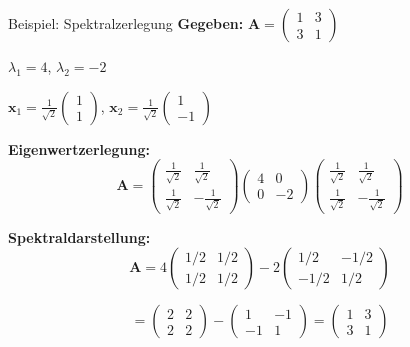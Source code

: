 \documentclass[a4paper, fontsize=7pt]{scrartcl}
\begin{document}
\begin{subbox}{Beispiel: Spektralzerlegung}
\textbf{Gegeben:} $\mathbf{A} = \begin{pmatrix} 1 & 3 \\ 3 & 1 \end{pmatrix}$

$\lambda_1 = 4$, $\lambda_2 = -2$

$\mathbf{x}_1 = \frac{1}{\sqrt{2}}\begin{pmatrix} 1 \\ 1 \end{pmatrix}$, $\mathbf{x}_2 = \frac{1}{\sqrt{2}}\begin{pmatrix} 1 \\ -1 \end{pmatrix}$

\textbf{Eigenwertzerlegung:}
$$\mathbf{A} = \begin{pmatrix} \frac{1}{\sqrt{2}} & \frac{1}{\sqrt{2}} \\ \frac{1}{\sqrt{2}} & -\frac{1}{\sqrt{2}} \end{pmatrix}\begin{pmatrix} 4 & 0 \\ 0 & -2 \end{pmatrix}\begin{pmatrix} \frac{1}{\sqrt{2}} & \frac{1}{\sqrt{2}} \\ \frac{1}{\sqrt{2}} & -\frac{1}{\sqrt{2}} \end{pmatrix}$$

\textbf{Spektraldarstellung:}
$$\mathbf{A} = 4 \begin{pmatrix} 1/2 & 1/2 \\ 1/2 & 1/2 \end{pmatrix} - 2\begin{pmatrix} 1/2 & -1/2 \\ -1/2 & 1/2 \end{pmatrix}$$

$$= \begin{pmatrix} 2 & 2 \\ 2 & 2 \end{pmatrix} - \begin{pmatrix} 1 & -1 \\ -1 & 1 \end{pmatrix} = \begin{pmatrix} 1 & 3 \\ 3 & 1 \end{pmatrix}$$
\end{subbox}

\end{document}
